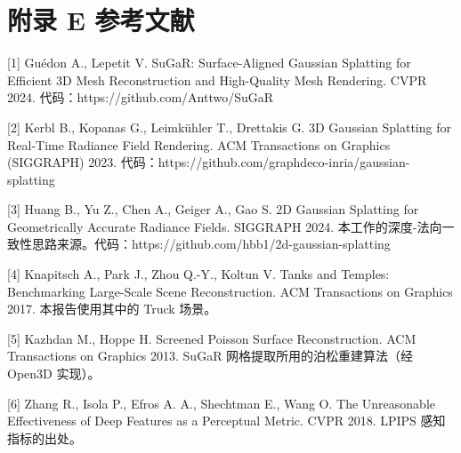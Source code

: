 \documentclass[UTF8,a4paper,11pt]{ctexart}
\begin{document}
\section{附录 E  参考文献}
[1] Guédon A., Lepetit V. SuGaR: Surface-Aligned Gaussian Splatting for Efficient 3D Mesh Reconstruction and High-Quality Mesh Rendering. CVPR 2024. 代码：https://github.com/Anttwo/SuGaR

[2] Kerbl B., Kopanas G., Leimkühler T., Drettakis G. 3D Gaussian Splatting for Real-Time Radiance Field Rendering. ACM Transactions on Graphics (SIGGRAPH) 2023. 代码：https://github.com/graphdeco-inria/gaussian-splatting

[3] Huang B., Yu Z., Chen A., Geiger A., Gao S. 2D Gaussian Splatting for Geometrically Accurate Radiance Fields. SIGGRAPH 2024. 本工作的深度-法向一致性思路来源。代码：https://github.com/hbb1/2d-gaussian-splatting

[4] Knapitsch A., Park J., Zhou Q.-Y., Koltun V. Tanks and Temples: Benchmarking Large-Scale Scene Reconstruction. ACM Transactions on Graphics 2017. 本报告使用其中的 Truck 场景。

[5] Kazhdan M., Hoppe H. Screened Poisson Surface Reconstruction. ACM Transactions on Graphics 2013. SuGaR 网格提取所用的泊松重建算法（经 Open3D 实现）。

[6] Zhang R., Isola P., Efros A. A., Shechtman E., Wang O. The Unreasonable Effectiveness of Deep Features as a Perceptual Metric. CVPR 2018. LPIPS 感知指标的出处。
\end{document}
